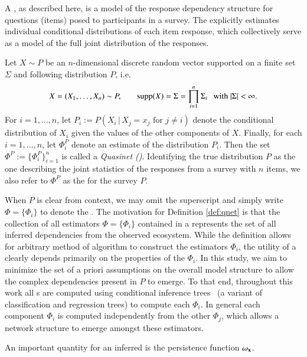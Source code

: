 \documentclass[onecolumn,10pt]{IEEEtran}
\begin{document}
A \qnet, as described here, is a model of the response dependency  structure for questions (items) posed to participants in a survey.  The \qnet explicitly estimates individual conditional distributions of each item response, which collectively serve as a model of the full joint distribution of the responses. 

\begin{defn}[\qnet]
  \label{def:qnet}
  Let $X \sim P$ be an $n$-dimensional discrete random vector supported on a finite set $\Sigma$ and following distribution $P$, i.e. \[X = (X_1, \ldots, X_n) \sim P, \hspace{0.25in} \operatorname{supp}(X) =  \Sigma = \displaystyle\prod_{i=1}^n \Sigma_i \hspace{.1in} \text{with } |\Sigma| < \infty.\] For $i = 1, \ldots, n$, let $P_i := P(X_i\,|\,X_j=x_j \text{ for } j \neq i)$ denote the conditional distribution of $X_i$ given the values of the other components of $X$.  Finally, for each $i = 1, \ldots, n$, let $\Phi^P_i$ denote an estimate of the distribution $P_i$.  Then the set $\Phi^P := \{\Phi^P_i\}_{i=1}^n$ is called a \emph{Quasinet (\qnet)}. Identifying the true distribution $P$ as the one describing the joint statistics of the responses from a survey with $n$ items, we also refer to  $\Phi^P$ as the \qnet for the survey $P$.
\end{defn}

When $P$ is clear from context, we may omit the superscript and simply write $\Phi = \{\Phi_i\}$ to denote the \qnet. The motivation for Definition \ref{def:qnet} is that the collection of all estimators $\Phi = \{ \Phi_i \}$ contained in a \qnet represents the set of all inferred dependencies from the observed ecosystem.  While the definition allows for arbitrary method of algorithm to construct the estimators $\Phi_i$, the utility of a \qnet clearly depends primarily on the properties of the $\Phi_i$.  In this study, we aim to minimize the set of a priori assumptions on the overall model structure to allow the complex dependencies present in $P$ to emerge. To that end, throughout this work all {\qnet}s are computed using conditional inference trees~\cite{sarda2017conditional} (a variant of classification and regression trees) to compute each $\Phi_i$. In general each \qnet component $\Phi_i$ is computed independently from the other $\Phi_j$, which allows a network structure to emerge amongst these estimators.

An important quantity for an inferred \qnet is the persistence function $\omega_{\bm{\mathrm{x}}}$.
\end{document}
